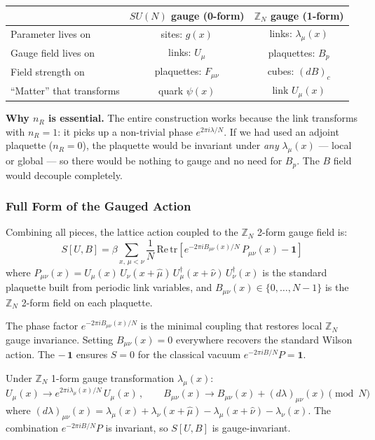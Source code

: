 \documentclass[12pt,a4paper]{article}
\begin{document}
\begin{table}[H]
\centering
\begin{tabular}{|l|c|c|}
\hline
 & $SU(N)$ gauge (0-form) & $\mathbb{Z}_N$ gauge (1-form) \\
\hline
Parameter lives on & sites: $g(x)$ & links: $\lambda_\mu(x)$ \\
Gauge field lives on & links: $U_\mu$ & plaquettes: $B_p$ \\
Field strength on & plaquettes: $F_{\mu\nu}$ & cubes: $(dB)_c$ \\
``Matter'' that transforms & quark $\psi(x)$ & link $U_\mu(x)$ \\
\hline
\end{tabular}
\end{table}

\textbf{Why $n_R$ is essential.}
The entire construction works because the link transforms with $n_R=1$:
it picks up a non-trivial phase $e^{2\pi i\lambda/N}$.
If we had used an adjoint plaquette ($n_R=0$), the plaquette would be invariant
under \emph{any} $\lambda_\mu(x)$ --- local or global ---
so there would be nothing to gauge and no need for $B_p$.
The $B$ field would decouple completely.

\subsubsection*{Full Form of the Gauged Action}

Combining all pieces, the lattice action coupled to the $\mathbb{Z}_N$ 2-form gauge field is:
\begin{equation}
  S[U,B] = \beta\sum_{x,\,\mu<\nu}
  \frac{1}{N}\,\mathrm{Re}\,\mathrm{tr}\!\left[
    e^{-2\pi i B_{\mu\nu}(x)/N}\,P_{\mu\nu}(x) - \mathbf{1}
  \right]
\end{equation}
where $P_{\mu\nu}(x) = U_\mu(x)\,U_\nu(x{+}\hat\mu)\,U_\mu^\dagger(x{+}\hat\nu)\,U_\nu^\dagger(x)$
is the standard plaquette built from periodic link variables,
and $B_{\mu\nu}(x) \in \{0,\ldots,N{-}1\}$ is the $\mathbb{Z}_N$ 2-form field on each plaquette.

The phase factor $e^{-2\pi iB_{\mu\nu}(x)/N}$ is the minimal coupling that restores
local $\mathbb{Z}_N$ gauge invariance. Setting $B_{\mu\nu}(x)=0$ everywhere
recovers the standard Wilson action. The $-\,\mathbf{1}$ ensures $S=0$ for the
classical vacuum $e^{-2\pi iB/N}P = \mathbf{1}$.

Under $\mathbb{Z}_N$ 1-form gauge transformation $\lambda_\mu(x)$:
\begin{equation}
  U_\mu(x) \to e^{2\pi i\lambda_\mu(x)/N}\,U_\mu(x)\,,\qquad
  B_{\mu\nu}(x) \to B_{\mu\nu}(x) + (d\lambda)_{\mu\nu}(x) \pmod{N}
\end{equation}
where $(d\lambda)_{\mu\nu}(x) = \lambda_\mu(x) + \lambda_\nu(x{+}\hat\mu)
- \lambda_\mu(x{+}\hat\nu) - \lambda_\nu(x)$.
The combination $e^{-2\pi iB/N}P$ is invariant, so $S[U,B]$ is gauge-invariant.
\end{document}
